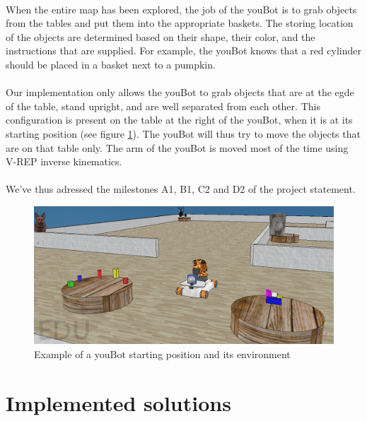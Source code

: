 \documentclass[12pt,a4paper]{article}
\begin{document}
\paragraph{}
When the entire map has been explored, the job of the 
youBot is to grab objects from the tables and put them 
into the appropriate baskets. The storing location of 
the objects are determined based on their shape, their 
color, and the instructions that are supplied. For 
example, the youBot knows that a red cylinder should be 
placed in a basket next to a pumpkin. 

\paragraph{}
Our implementation only allows the youBot to grab 
objects that are at the egde of the table, stand 
upright, and are well separated from each other. This configuration is present on the table at the right of the youBot, when it is at its starting position (see figure \ref{youbotStart}). The youBot will thus try to move the objects that are on that table only. The arm of the youBot is moved most of the time using V-REP inverse kinematics.

\paragraph{}
We've thus adressed the milestones A1, B1, C2 and D2 of the project statement\cite{trs}.

\begin{figure}[h]
	\centering
		\includegraphics[width=1.00\textwidth]{starting_position.png}
	\caption{Example of a youBot starting position and its environment}
	\label{youbotStart}
\end{figure}

\FloatBarrier

\section{Implemented solutions}
\end{document}
